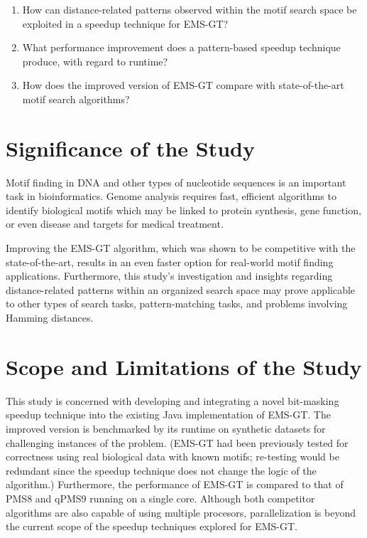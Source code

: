 \documentclass[oneside,12pt]{DISCSthesis}
\begin{document}
		\begin{enumerate}
		\item How can distance-related patterns observed within the motif search space be exploited in a speedup technique for EMS-GT?
		\item What performance improvement does a pattern-based speedup technique produce, with regard to runtime? %
		\item How does the improved version of EMS-GT compare with state-of-the-art motif search algorithms?
		\end{enumerate}

	\section{Significance of the Study}
		Motif finding in DNA and other types of nucleotide sequences is an important task in bioinformatics. Genome analysis requires fast, efficient algorithms to identify biological motifs which may be linked to protein synthesis, gene function, or even disease and targets for medical treatment. 

		Improving the EMS-GT algorithm, which was shown to be competitive with the state-of-the-art, results in an even faster option for real-world motif finding applications. Furthermore, this study's investigation and insights regarding distance-related patterns within an organized search space may prove applicable to other types of search tasks, pattern-matching tasks, and problems involving Hamming distances.

	\section{Scope and Limitations of the Study}
		This study is concerned with developing and integrating a novel bit-masking speedup technique into the existing Java implementation of EMS-GT. The improved version is benchmarked by its runtime on synthetic datasets for challenging instances of the problem. (EMS-GT had been previously tested for correctness using real biological data with known motifs; re-testing would be redundant since the speedup technique does not change the logic of the algorithm.)	
		Furthermore, the performance of EMS-GT is compared to that of PMS8 and qPMS9 running on a single core. Although both competitor algorithms are also capable of using multiple procesors, parallelization is beyond the current scope of the speedup techniques explored for EMS-GT.
\end{document}
